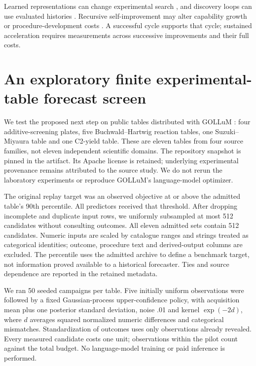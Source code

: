 Learned representations can change experimental search \citep{rankovic2026}, and discovery loops can use evaluated histories \citep{ye2026v2}. Recursive self-improvement may alter capability growth or procedure-development costs \citep{zhang2026dgm,zhang2026hyperagents}. A successful cycle supports that cycle; sustained acceleration requires measurements across successive improvements and their full costs.


\section{An exploratory finite experimental-table forecast screen}
\label{app:finite_table}
We test the proposed next step on public tables distributed with GOLLuM \citep{rankovic2026}: four additive-screening plates, five Buchwald--Hartwig reaction tables, one Suzuki--Miyaura table and one C2-yield table. These are eleven tables from four source families, not eleven independent scientific domains. The repository snapshot is pinned in the artifact. Its Apache license is retained; underlying experimental provenance remains attributed to the source study. We do not rerun the laboratory experiments or reproduce GOLLuM's language-model optimizer.

The original replay target was an observed objective at or above the admitted table's 90th percentile. All predictors received that threshold. After dropping incomplete and duplicate input rows, we uniformly subsampled at most 512 candidates without consulting outcomes. All eleven admitted sets contain 512 candidates. Numeric inputs are scaled by catalogue ranges and strings treated as categorical identities; outcome, procedure text and derived-output columns are excluded. The percentile uses the admitted archive to define a benchmark target, not information proved available to a historical forecaster. Ties and source dependence are reported in the retained metadata.

We ran 50 seeded campaigns per table. Five initially uniform observations were followed by a fixed Gaussian-process upper-confidence policy, with acquisition mean plus one posterior standard deviation, noise .01 and kernel $\exp(-2d)$, where $d$ averages squared normalized numeric differences and categorical mismatches. Standardization of outcomes uses only observations already revealed. Every measured candidate costs one unit; observations within the pilot count against the total budget. No language-model training or paid inference is performed.


